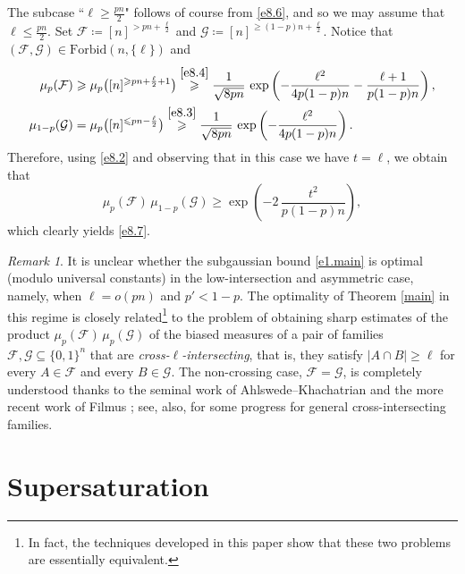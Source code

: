 \documentclass[10pt]{amsart}
\theoremstyle{remark}
\newtheorem{rem}[thm]{Remark}
\newcommand{\meg}{\geqslant}
\newcommand{\mik}{\leqslant}
\newcommand{\Fcal}{\mathcal{F}}
\newcommand{\Gcal}{\mathcal{G}}
\begin{document}
The subcase ``$\ell\meg \frac{pn}{2}$" follows of course from \eqref{e8.6},
and so we may assume that $\ell\mik \frac{pn}{2}$. Set $\Fcal\coloneqq [n]^{>pn+\frac{\ell}{2}}$
and $\Gcal\coloneqq [n]^{\meg(1-p)n+\frac{\ell}{2}}$. Notice that $(\Fcal,\Gcal)\in\mathrm{Forbid}(n,\{\ell\})$ and
\begin{align}
\label{e8.8} \mu_{p}(\Fcal) & \meg \mu_p\big([n]^{\meg pn+\frac{\ell}{2}+1}\big) \stackrel{\eqref{e8.4}}{\meg}
\frac{1}{\sqrt{8pn}}\, \exp\left(-\frac{\ell^2}{4p(1-p)n}-\frac{\ell+1}{p(1-p)n}\right), \\
\label{e8.9} \mu_{1-p}(\Gcal) & = \mu_p\big([n]^{\mik pn-\frac{\ell}{2}}\big) \stackrel{\eqref{e8.3}}{\meg}
\frac{1}{\sqrt{8pn}}\, \exp\left(-\frac{\ell^2}{4p(1-p)n}\right).
\end{align}
Therefore, using \eqref{e8.2} and observing that in this case we have $t=\ell$, we obtain that
\begin{equation} \label{e8.10}
\mu_p(\Fcal)\, \mu_{1-p}(\Gcal)\meg \exp\left(-2\, \frac{t^2}{p(1-p)n}\right),
\end{equation}
which clearly yields \eqref{e8.7}.
\begin{rem} \label{r8.3}
It is unclear whether the subgaussian bound \eqref{e1.main} is optimal (modulo universal constants)
in the low-intersection and asymmetric case, namely, when $\ell=o(pn)$ and $p'<1-p$. The optimality of
Theorem \ref{main} in this regime is closely related\footnote{In fact, the techniques developed in this
paper show that these two problems are essentially equivalent.} to the problem of obtaining sharp estimates
of the product $\mu_p(\Fcal)\,\mu_p(\Gcal)$ of the biased measures of a pair of families
$\Fcal,\Gcal\subseteq \{0,1\}^n$ that are \emph{cross-$\ell$-intersecting}, that is, they satisfy
$|A\cap B|\meg\ell$ for every $A\in\Fcal$ and every $B\in\Gcal$. The non-crossing case, $\Fcal=\Gcal$,
is completely understood thanks to the seminal work of Ahlswede--Khachatrian \cite{AK97,AK99}
and the more recent work of Filmus \cite{Fi17}; see, also, \cite[Theorem 3.28]{Fi13} for some progress
for general cross-intersecting families.
\end{rem}


\section{Supersaturation} \label{sec9}

\end{document}
